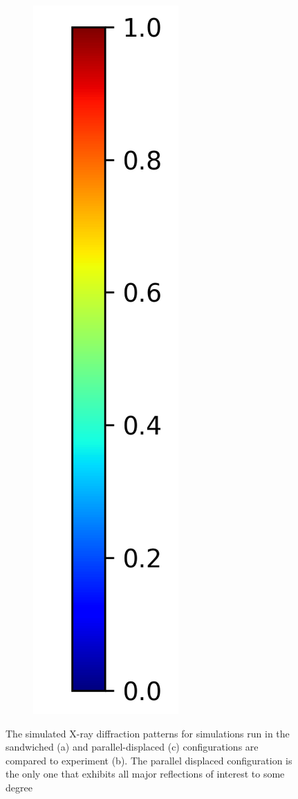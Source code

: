 \documentclass{article}
\begin{document}
\begin{figure}
\begin{subfigure}{0.0544\linewidth}
        \includegraphics[width=\linewidth]{colorbar_jet.png}
  \end{subfigure}
  \caption{The simulated X-ray diffraction patterns for simulations run in the
  sandwiched (a) and parallel-displaced (c) configurations are compared to experiment (b). 
  The parallel displaced configuration is the only one that exhibits all major
  reflections of interest to some degree}
  \label{fig:XRDsim}
  \end{figure}
\end{document}
